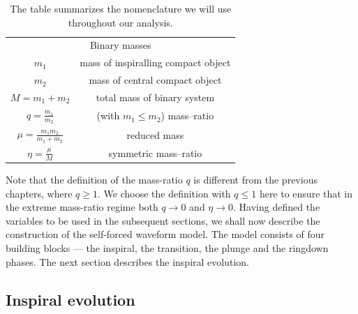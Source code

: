 \begin{table}[thb]
\centering
\begin{tabular}{|c| c| }
\hline
\multicolumn{2}{|c|}{Binary masses}  \\\cline{1-2} 
\(m_1\) & mass of inspiralling compact object  \\ [0.7ex] 
\(m_2 \) & mass of central compact object  \\ [0.7ex]  
\(M=m_1+m_2 \) & total mass of binary system \\ [0.7ex]  
\(q=\frac{m_1}{m_2} \) & (with $m_1\leq m_2$) mass--ratio \\ [0.9ex]  
\(\mu=\frac{m_1 m_2}{m_1 + m_2} \) & reduced mass \\ [0.9ex]  
\(\eta= \frac{\mu}{M}\) & symmetric mass--ratio \\ [0.9ex]  
\hline
\end{tabular}
\caption{The table summarizes the nomenclature we will use throughout our analysis.}
\label{length}
\end{table}

Note that the definition of the mass-ratio $q$ is different from the previous chapters, where
$q\geq 1$. We choose the definition with $q\leq 1$ here to ensure that in the 
extreme mass-ratio regime both $q\rightarrow 0$ and $\eta\rightarrow 0$.
Having defined the variables to be used in the subsequent sections, we shall now describe the construction of the self-forced waveform model. The model consists of four building blocks --- the inspiral, the transition, the plunge and the ringdown phases. The next section describes the inspiral evolution. 

\subsection{Inspiral evolution}

